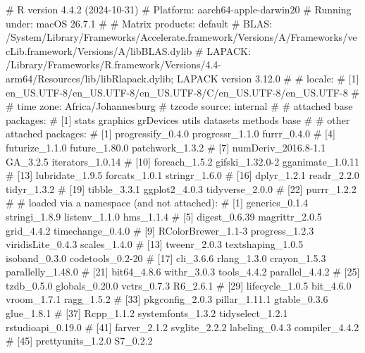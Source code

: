 \documentclass[
  a4paper,
  DIV=11,
  numbers=noendperiod]{scrartcl}
\newenvironment{Shaded}{\begin{snugshade}}{\end{snugshade}}
\newcommand{\CommentTok}[1]{\textcolor[rgb]{0.37,0.37,0.37}{#1}}
\newcommand{\+}{\phantom{-}}
\begin{document}
\begin{Shaded}
\begin{Highlighting}[]
\CommentTok{\# R version 4.4.2 (2024{-}10{-}31)}
\CommentTok{\# Platform: aarch64{-}apple{-}darwin20}
\CommentTok{\# Running under: macOS 26.7.1}
\CommentTok{\# }
\CommentTok{\# Matrix products: default}
\CommentTok{\# BLAS:   /System/Library/Frameworks/Accelerate.framework/Versions/A/Frameworks/vecLib.framework/Versions/A/libBLAS.dylib }
\CommentTok{\# LAPACK: /Library/Frameworks/R.framework/Versions/4.4{-}arm64/Resources/lib/libRlapack.dylib;  LAPACK version 3.12.0}
\CommentTok{\# }
\CommentTok{\# locale:}
\CommentTok{\# [1] en\_US.UTF{-}8/en\_US.UTF{-}8/en\_US.UTF{-}8/C/en\_US.UTF{-}8/en\_US.UTF{-}8}
\CommentTok{\# }
\CommentTok{\# time zone: Africa/Johannesburg}
\CommentTok{\# tzcode source: internal}
\CommentTok{\# }
\CommentTok{\# attached base packages:}
\CommentTok{\# [1] stats     graphics  grDevices utils     datasets  methods   base     }
\CommentTok{\# }
\CommentTok{\# other attached packages:}
\CommentTok{\#  [1] progressify\_0.4.0   progressr\_1.1.0     furrr\_0.4.0        }
\CommentTok{\#  [4] futurize\_1.1.0      future\_1.80.0       patchwork\_1.3.2    }
\CommentTok{\#  [7] numDeriv\_2016.8{-}1.1 GA\_3.2.5            iterators\_1.0.14   }
\CommentTok{\# [10] foreach\_1.5.2       gifski\_1.32.0{-}2     gganimate\_1.0.11   }
\CommentTok{\# [13] lubridate\_1.9.5     forcats\_1.0.1       stringr\_1.6.0      }
\CommentTok{\# [16] dplyr\_1.2.1         readr\_2.2.0         tidyr\_1.3.2        }
\CommentTok{\# [19] tibble\_3.3.1        ggplot2\_4.0.3       tidyverse\_2.0.0    }
\CommentTok{\# [22] purrr\_1.2.2        }
\CommentTok{\# }
\CommentTok{\# loaded via a namespace (and not attached):}
\CommentTok{\#  [1] generics\_0.1.4     stringi\_1.8.9      listenv\_1.1.0      hms\_1.1.4         }
\CommentTok{\#  [5] digest\_0.6.39      magrittr\_2.0.5     grid\_4.4.2         timechange\_0.4.0  }
\CommentTok{\#  [9] RColorBrewer\_1.1{-}3 progress\_1.2.3     viridisLite\_0.4.3  scales\_1.4.0      }
\CommentTok{\# [13] tweenr\_2.0.3       textshaping\_1.0.5  isoband\_0.3.0      codetools\_0.2{-}20  }
\CommentTok{\# [17] cli\_3.6.6          rlang\_1.3.0        crayon\_1.5.3       parallelly\_1.48.0 }
\CommentTok{\# [21] bit64\_4.8.6        withr\_3.0.3        tools\_4.4.2        parallel\_4.4.2    }
\CommentTok{\# [25] tzdb\_0.5.0         globals\_0.20.0     vctrs\_0.7.3        R6\_2.6.1          }
\CommentTok{\# [29] lifecycle\_1.0.5    bit\_4.6.0          vroom\_1.7.1        ragg\_1.5.2        }
\CommentTok{\# [33] pkgconfig\_2.0.3    pillar\_1.11.1      gtable\_0.3.6       glue\_1.8.1        }
\CommentTok{\# [37] Rcpp\_1.1.2         systemfonts\_1.3.2  tidyselect\_1.2.1   rstudioapi\_0.19.0 }
\CommentTok{\# [41] farver\_2.1.2       svglite\_2.2.2      labeling\_0.4.3     compiler\_4.4.2    }
\CommentTok{\# [45] prettyunits\_1.2.0  S7\_0.2.2   }
\end{Highlighting}
\end{Shaded}
\end{document}

